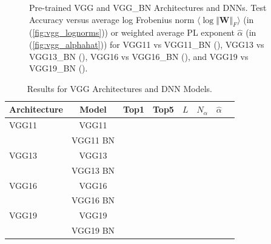 \begin{figure}[t]
{      \label{fig:vgg_alphahat}
   }
   \caption{%
      Pre-trained VGG and VGG\_BN Architectures and DNNs.  
      Test Accuracy versus
      average log Frobenius norm $\langle\log\Vert\mathbf{W}\Vert_{F}\rangle$ (in (\ref{fig:vgg_lognorms}))
      or
      weighted average PL exponent $\hat{\alpha}$ (in (\ref{fig:vgg_alphahat}))
      for
      VGG11 vs VGG11\_BN ({\color{blue}{blue}}),
      VGG13 vs VGG13\_BN ({\color{orange}{orange}}),
      VGG16 vs VGG16\_BN ({\color{green}{green}}),  and
      VGG19 vs VGG19\_BN ({\color{red}{red}}). 
   }
   \label{fig:vgg}
\end{figure}





\begin{table}[t]
\small
\begin{center}
\begin{tabular}{|p{0.75in}|c|c|c|c|c|c|c|}
\hline
Architecture 
 & Model &Top1 
 & Top5 & $L$ & $N_{\alpha}$ & $\hat{\alpha}$ \\
\hline
VGG11 & VGG11 & & & & & \\
  & VGG11 BN & & & & & \\
\hline
VGG13 & VGG13 & & & & & \\
  & VGG13 BN & & & & & \\
\hline
VGG16 & VGG16 & & & & & \\
  & VGG16 BN & & & & & \\
\hline
VGG19 & VGG19 & & & & & \\
  & VGG19 BN & & & & & \\
\hline
\end{tabular}
\end{center}
\caption{Results for VGG Architectures and DNN Models.}
\label{table:models_VGG}
\end{table}


